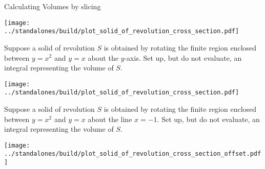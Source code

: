 \documentclass[../main.tex]{subfiles}
\begin{document}
\begin{lesson}{Calculating Volumes by slicing}
\begin{example}

    \texttt{[image: ../standalones/build/plot\_solid\_of\_revolution\_cross\_section.pdf]}
  \end{example}
  \clearpage

  \begin{example}
    Suppose a solid of revolution $S$ is obtained by rotating the finite region enclosed between $y = x^{2}$ and $y = x$ about the $y$-axis.  Set up, but do not evaluate, an integral representing the volume of $S$.

    \begin{center}
      \texttt{[image: ../standalones/build/plot\_solid\_of\_revolution\_cross\_section.pdf]}
    \end{center}
  \end{example}
  \clearpage

  \begin{example}
    Suppose a solid of revolution $S$ is obtained by rotating the finite region enclosed between $y = x^{2}$ and $y = x$ about the line $x = -1$.  Set up, but do not evaluate, an integral representing the volume of $S$.

    \begin{center}
      \texttt{[image: ../standalones/build/plot\_solid\_of\_revolution\_cross\_section\_offset.pdf]}
    \end{center}
  \end{example}
\end{lesson}
\end{document}
